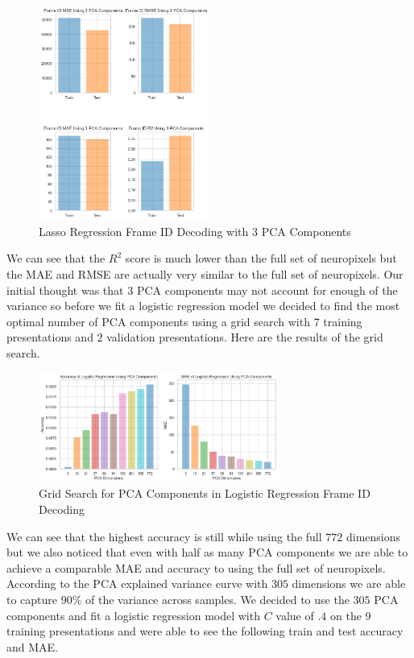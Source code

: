 \documentclass[12pt, letterpaper]{article}
\begin{document}
\begin{figure}[H]
    \centering
    \includegraphics[width=0.5\textwidth]{frame_id_metrics_lasso_using_pca.08.png}
    \caption{Lasso Regression Frame ID Decoding with 3 PCA Components}
    \label{fig:pca_frame_id_lasso}
\end{figure}

We can see that the $R^2$ score is much lower than the full set of neuropixels but the MAE and RMSE are actually very similar to the full set of neuropixels. Our initial thought was that $3$ PCA components may not account for enough of the variance so before we fit a logistic regression model we decided to find the most optimal number of PCA components using a grid search with $7$ training presentations and $2$ validation presentations. Here are the results of the grid search.

\begin{figure}[H]
    \centering
    \includegraphics[width=0.7\textwidth]{logistic_pca_accuracy_mae.png}
    \caption{Grid Search for PCA Components in Logistic Regression Frame ID Decoding}
    \label{fig:logistic_pca_accuracy_mae}
\end{figure}

We can see that the highest accuracy is still while using the full $772$ dimensions but we also noticed that even with half as many PCA components we are able to achieve a comparable MAE and accuracy to using the full set of neuropixels. According to the PCA explained variance curve with $305$ dimensions we are able to capture $90\%$ of the variance across samples. We decided to use the $305$ PCA components and fit a logistic regression model with $C$ value of $.4$ on the $9$ training presentations and were able to see the following train and test accuracy and MAE.
\end{document}
